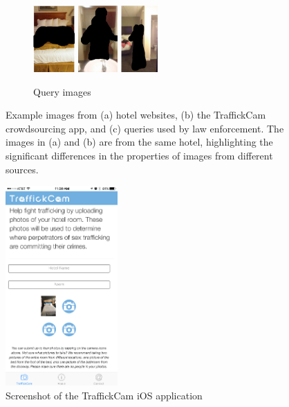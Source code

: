 \documentclass[letterpaper]{article} %
\begin{document}
\begin{figure}
\begin{subfigure}[b]{.6\textwidth}
    \end{subfigure}
   \begin{subfigure}[b]{.3\textwidth}
   \centering
    \includegraphics[height=1in]{figures/example_images/queries/1.png}
    \includegraphics[height=1in]{figures/example_images/queries/2.png}
    \includegraphics[height=1in]{figures/example_images/queries/3.png}
    \caption{Query images}
    \end{subfigure}
    \caption[Image variability from different sources]{Example images from (a) hotel websites, (b) the TraffickCam crowdsourcing app, and (c) queries used by law enforcement. The images in (a) and (b) are from the same hotel, highlighting the significant differences in the properties of images from different sources.}
    \label{fig:domainImages}
\end{figure}

\begin{figure}
    \centering
    \includegraphics[height=3in]{figures/screenshots/1.png}
    \caption{Screenshot of the TraffickCam iOS application}
    \label{fig:tcamScreenshots}
\end{figure}
\end{document}

